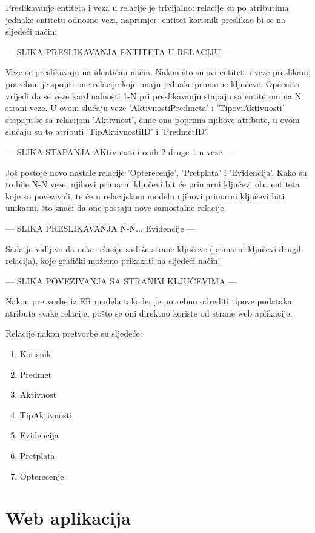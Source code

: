 \documentclass[times, utf8, zavrsni]{fer}
\begin{document}
Preslikavanje entiteta i veza u relacije je trivijalno: relacije su po atributima jednake entitetu odnosno vezi, naprimjer: entitet korisnik preslikao bi se na sljedeći način:

--- SLIKA PRESLIKAVANJA ENTITETA U RELACIJU ---

Veze se preslikavaju na identičan način.
Nakon što su svi entiteti i veze preslikani, potrebnu je spojiti one relacije koje imaju jednake primarne ključeve. Općenito vrijedi da se veze kardinalnosti 1-N pri preslikavanju stapaju sa entitetom na N strani veze. U ovom slučaju veze 'AktivnostiPredmeta' i 'TipoviAktivnosti' stapaju se sa relacijom 'Aktivnost', čime ona poprima njihove atribute, u ovom slučaju su to atributi 'TipAktivnostiID' i 'PredmetID'.

--- SLIKA STAPANJA AKtivnosti i onih 2 druge 1-n veze ---

Još postoje novo nastale relacije 'Opterecenje', 'Pretplata' i 'Evidencija'. Kako su to bile N-N veze, njihovi primarni ključevi bit će primarni ključevi oba entiteta koje su povezivali, te će u relacijskom modelu njihovi primarni ključevi biti unikatni, što znači da one postaju nove samostalne relacije.

--- SLIKA PRESLIKAVANJA N-N... Evidencije ---

Sada je vidljivo da neke relacije sadrže strane ključeve (primarni ključevi drugih relacija), koje grafički možemo prikazati na sljedeći način:

--- SLIKA POVEZIVANJA SA STRANIM KLJUČEVIMA ---

Nakon pretvorbe iz ER modela također je potrebno odrediti tipove podataka atributa svake relacije, pošto se oni direktno koriste od strane web aplikacije.

Relacije nakon pretvorbe su sljedeće:
\begin{enumerate}
\item Korisnik
\item Predmet
\item Aktivnost
\item TipAktivnosti
\item Evidencija
\item Pretplata
\item Opterecenje
\end{enumerate}

\lstset{language=SQL, tabsize=4}


\chapter{Web aplikacija}
\end{document}
